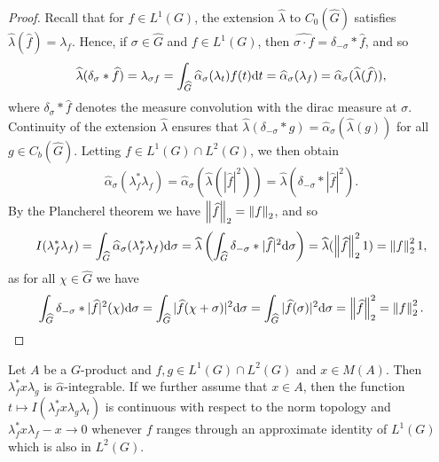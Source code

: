 \begin{proof}
	Recall that for $f \in L^1(G)$, the extension $\hat \lambda$ to $C_0(\hat G)$ satisfies $\hat \lambda(\hat f) = \lambda_f$. Hence, if $\sigma \in \hat G$ and $f \in L^1(G)$, then $\hat {\sigma \cdot f } = \delta_{-\sigma} \ast \hat f$, and so
	\begin{align*}
		\widehat{\lambda} (\delta_\sigma \ast \widehat{f}) = \lambda_{\sigma f} = \int_{\widehat{G}} \widehat{\alpha}_\sigma(\lambda_t) f(t) \mathrm{d} t  = \widehat{\alpha}_\sigma ( \lambda_f) = \widehat{\alpha}_\sigma ( \widehat{\lambda}(\widehat{f})),
	\end{align*}
	where $\delta_{\sigma} \ast \hat f$ denotes the measure convolution with the dirac measure at $\sigma$. Continuity of the extension $\hat \lambda$ ensures that $\hat \lambda(\delta_{-\sigma} \ast g) = \hat \alpha_{\sigma}(\hat \lambda(g))$ for all $g \in C_b(\hat G)$. Letting $f \in L^1(G) \cap L^2(G)$, we then obtain
	\begin{align*}
		\hat \alpha_\sigma(\lambda_f^* \lambda_f) = \hat \alpha_\sigma(\hat \lambda( | \hat f | ^2)) = \hat \lambda(\delta_{-\sigma} \ast | \hat f |^2).		
	\end{align*}
	By the Plancherel theorem we have $\left\lVert\widehat{f} \right\rVert_2 = \left\lVert f \right\rVert_2$, and so
	\begin{align*}
		I(\lambda_f^* \lambda_f) =\int_{\widehat{G}} \widehat{\alpha}_\sigma(\lambda_f^* \lambda_f) \mathrm{d} \sigma = \widehat{\lambda}\left(\int_{\widehat{G}} \delta_{-\sigma} \ast  | \widehat{f} |^2 \mathrm{d} \sigma  \right) =\widehat{\lambda} (\left\lVert \widehat{f} \right\rVert_2^2 1) = \left\lVert f \right\rVert_2^2 1,
	\end{align*}
	as for all $\chi \in \hat G$ we have
	\begin{align*}
		\int_{\widehat{G} } \delta_{-\sigma} \ast |\widehat{f}|^2(\chi) \mathrm{d} \sigma = \int_{\widehat{G}} |\widehat{f}(\chi + \sigma)|^2 \mathrm{d} \sigma =  \int_{\widehat{G}} | \widehat{f}(\sigma)|^2 \mathrm{d} \sigma = \left\lVert \widehat{f}\right\rVert_2^2 = \left\lVert f \right\rVert_2^2.
	\end{align*}
\end{proof}
\begin{lemma}
	Let $A$ be a $G$-product and $f,g \in L^1(G) \cap L^2(G)$ and $x \in M(A)$. Then $ \lambda_f^* x \lambda_g$ is $\hat \alpha$-integrable. If we further assume that $x \in A$, then the function $t \mapsto I(\lambda_f^* x \lambda_g \lambda_t)$ is continuous with respect to the norm topology and $\lambda_f^* x \lambda_f - x \to 0$ whenever $f$ ranges through an approximate identity of $L^1(G)$ which is also in $L^2(G)$.
	\label{olpe1lemma2.7}
\end{lemma}
